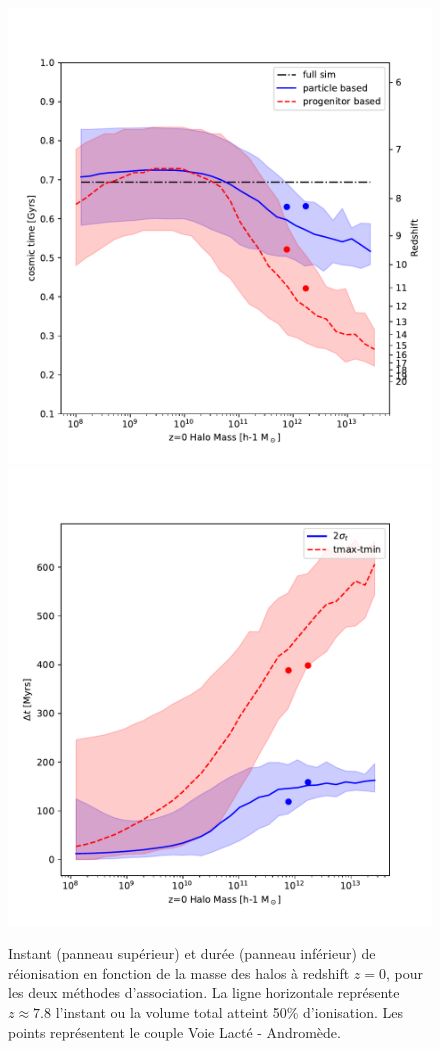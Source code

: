 \begin{figure}
		\centering
        \includegraphics[height=.45\textheight]{img/05/track_treion_LG.pdf}
        \includegraphics[height=.45\textheight]{img/05/track_dt_2sig_LG.pdf} 
        \caption[Instant et durée de réionisation]{Instant (panneau supérieur) et durée (panneau inférieur) de réionisation en fonction de la masse des halos à redshift $z=0$, pour les deux méthodes d'association. 
        La ligne horizontale représente $z\approx7.8$ l'instant ou la volume total atteint 50\% d'ionisation.
        Les points représentent le couple Voie Lacté - Andromède.
		\label{fig:CODA_t}}
\end{figure}


